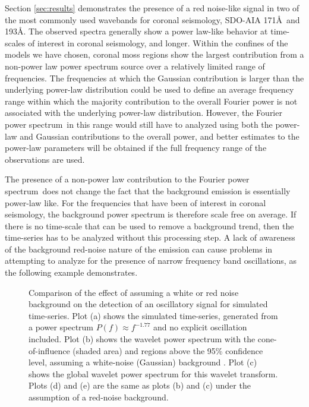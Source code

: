 \documentclass[preprint]{../aastex52/aastex}
\newcommand{\PS}{power spectrum}
\newcommand{\Fps}{Fourier \PS}
\begin{document}
Section \ref{sec:results} demonstrates the presence of a red
noise-like signal in two of the most commonly used wavebands for
coronal seismology, SDO-AIA 171\AA\ and 193\AA.  The observed spectra
generally show a power law-like behavior at time-scales of interest in
coronal seismology, and longer.  Within the confines of the models we
have chosen, coronal moss regions show the largest contribution from a
non-power law power spectrum source over a relatively limited range of
frequencies.  The frequencies at which the Gaussian contribution is
larger than the underlying power-law distribution could be used to
define an average frequency range within which the majority
contribution to the overall Fourier power is not associated with the
underlying power-law distribution.  However, the \Fps\ in this range
would still have to analyzed using both the power-law and Gaussian
contributions to the overall power, and better estimates to the
power-law parameters will be obtained if the full frequency range of
the observations are used.

The presence of a non-power law contribution to the \Fps\ does not
change the fact that the background emission is essentially power-law
like.  For the frequencies that have been of interest in coronal
seismology, the background power spectrum is therefore scale free on
average.  If there is no time-scale that can be used to remove a
background trend, then the time-series has to be analyzed without this
processing step.  A lack of awareness of the background red-noise
nature of the emission can cause problems in attempting to analyze for
the presence of narrow frequency band oscillations, as the following
example demonstrates.

\begin{figure}
\caption{Comparison of the effect of assuming a white or red noise
  background on the detection of an oscillatory signal for simulated
  time-series.  Plot (a) shows the simulated time-series, generated
  from a power spectrum \protect$P(f)\approx f^{-1.77}$ and no
  explicit oscillation included.  Plot (b) shows the wavelet power
  spectrum with the cone-of-influence (shaded area) and regions above
  the 95\% confidence level, assuming a white-noise (Gaussian)
 background .  Plot (c) shows the global wavelet power spectrum for
  this wavelet transform.  Plots (d) and (e) are the same as plots (b)
  and (c) under the assumption of a red-noise background.\label{fig:comparison}}
\end{figure}
\end{document}
